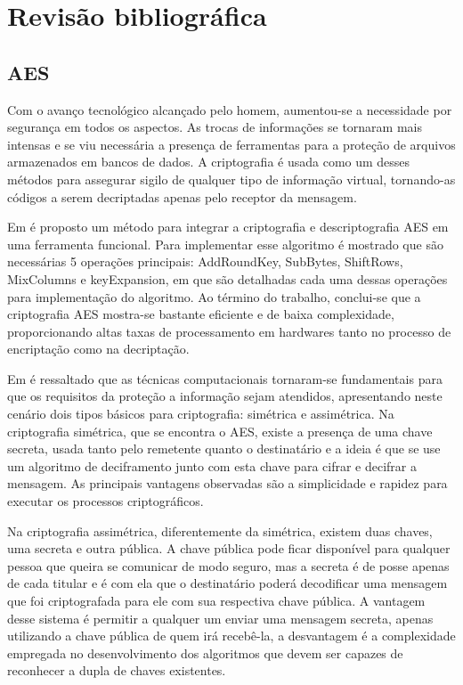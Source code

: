 \chapter{Revisão bibliográfica}

\section{AES}

Com o avanço tecnológico alcançado pelo homem, aumentou-se a necessidade por segurança em todos os aspectos. As trocas de informações se tornaram mais intensas e se viu necessária a presença de ferramentas para a proteção de arquivos armazenados em bancos de dados. A criptografia é usada como um desses métodos para assegurar sigilo de qualquer tipo de informação virtual, tornando-as códigos a serem decriptadas apenas pelo receptor da mensagem. 

Em \cite{lu2002integrated} é proposto um método para integrar a criptografia e descriptografia AES em uma ferramenta funcional. Para implementar esse algoritmo é mostrado que são necessárias 5 operações principais: AddRoundKey, SubBytes, ShiftRows, MixColumns e keyExpansion, em que são detalhadas cada uma dessas operações para implementação do algoritmo. Ao término do trabalho, conclui-se que a criptografia AES mostra-se bastante eficiente e de baixa complexidade, proporcionando altas taxas de processamento em hardwares tanto no processo de encriptação como na decriptação.

Em \cite{oliveira2012criptografia} é ressaltado que as técnicas computacionais tornaram-se fundamentais para que os requisitos da proteção a informação sejam atendidos, apresentando neste cenário dois tipos básicos para criptografia: simétrica e assimétrica.
Na criptografia simétrica, que se encontra o AES, existe a presença de uma chave secreta, usada tanto pelo remetente quanto o destinatário e a ideia é que se use um algoritmo de deciframento junto com esta chave para cifrar e decifrar a mensagem. As principais vantagens observadas são a simplicidade e rapidez para executar os processos criptográficos.

Na criptografia assimétrica, diferentemente da simétrica, existem duas chaves, uma secreta e outra pública. A chave pública pode ficar disponível para qualquer pessoa que queira se comunicar de modo seguro, mas a secreta é de posse apenas de cada titular e é com ela que o destinatário poderá decodificar uma mensagem que foi criptografada para ele com sua respectiva chave pública. A vantagem desse sistema é permitir a qualquer um enviar uma mensagem secreta, apenas utilizando a chave pública de quem irá recebê-la, a desvantagem é a complexidade empregada no desenvolvimento dos algoritmos que devem ser capazes de reconhecer a dupla de chaves existentes.
